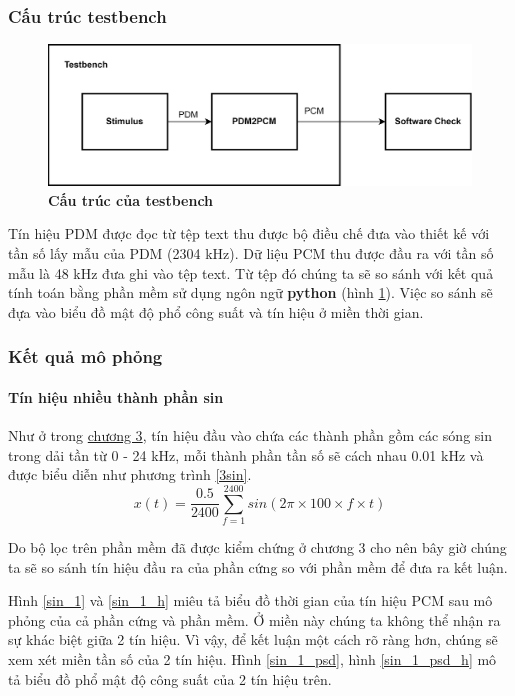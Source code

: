 \subsubsection{Cấu trúc testbench}
\begin{figure}[H]
    \centering
    \includegraphics[width=13cm]{Images/Chuong4/tb/tb_top.png}
    \caption[Cấu trúc của testbench]{\bfseries \fontsize{12pt}{0pt}\selectfont  Cấu trúc của testbench}
    \label{tb_top}
\end{figure}

Tín hiệu PDM được đọc từ tệp text thu được bộ điều chế đưa vào thiết kế với tần số lấy mẫu của PDM (2304 kHz). Dữ liệu PCM thu được đầu ra với tần số mẫu là 48 kHz đưa ghi vào tệp text. Từ tệp đó chúng ta sẽ so sánh với kết quả tính toán bằng phần mềm sử dụng ngôn ngữ \textbf{python} (hình \ref{tb_top}). Việc so sánh sẽ đựa vào biểu đồ mật độ phổ công suất và tín hiệu ở miền thời gian.

\subsubsection{Kết quả mô phỏng}
\paragraph{Tín hiệu nhiều thành phần sin}
Như ở trong \hyperref[chuong3]{chương 3}, tín hiệu đầu vào chứa các thành phần gồm các sóng sin trong dải tần từ 0 - 24 kHz, mỗi thành phần tần số sẽ cách nhau 0.01 kHz và được biểu diễn như phương trình \ref{3sin}.
\begin{equation} \label{3sin}
    x(t) = \frac{0.5}{2400}\sum^{2400}_{f = 1}sin(2\pi \times 100 \times f \times t)
\end{equation}

Do bộ lọc trên phần mềm đã được kiểm chứng ở chương 3 cho nên bây giờ chúng ta sẽ so sánh tín hiệu đầu ra của phần cứng so với phần mềm để đưa ra kết luận.


Hình \ref{sin_1} và \ref{sin_1_h} miêu tả biểu đồ thời gian của tín hiệu PCM sau mô phỏng của cả phần cứng và phần mềm. Ở miền này chúng ta không thể nhận ra sự khác biệt giữa 2 tín hiệu. Vì vậy, để kết luận một cách rõ ràng hơn, chúng sẽ xem xét miền tần số của 2 tín hiệu. Hình \ref{sin_1_psd}, hình \ref{sin_1_psd_h} mô tả biểu đồ phổ mật độ công suất của 2 tín hiệu trên.

